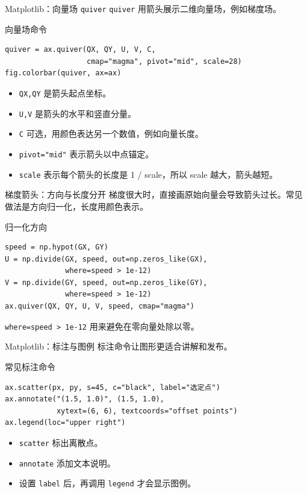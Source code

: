\documentclass[aspectratio=169,11pt]{ctexbeamer}
\begin{document}
\begin{frame}[fragile]{Matplotlib：向量场 \texttt{quiver}}
  \texttt{quiver} 用箭头展示二维向量场，例如梯度场。

  \begin{block}{向量场命令}
\begin{Verbatim}[fontsize=\small]
quiver = ax.quiver(QX, QY, U, V, C,
                   cmap="magma", pivot="mid", scale=28)
fig.colorbar(quiver, ax=ax)
\end{Verbatim}
  \end{block}

  \begin{itemize}
    \item \texttt{QX,QY} 是箭头起点坐标。
    \item \texttt{U,V} 是箭头的水平和竖直分量。
    \item \texttt{C} 可选，用颜色表达另一个数值，例如向量长度。
    \item \texttt{pivot="mid"} 表示箭头以中点锚定。
    \item \texttt{scale} 表示每个箭头的长度是 1 / scale，所以 scale 越大，箭头越短。
  \end{itemize}
\end{frame}

\begin{frame}[fragile]{梯度箭头：方向与长度分开}
  梯度很大时，直接画原始向量会导致箭头过长。常见做法是方向归一化，长度用颜色表示。

  \begin{block}{归一化方向}
\begin{Verbatim}[fontsize=\small]
speed = np.hypot(GX, GY)
U = np.divide(GX, speed, out=np.zeros_like(GX),
              where=speed > 1e-12)
V = np.divide(GY, speed, out=np.zeros_like(GY),
              where=speed > 1e-12)
ax.quiver(QX, QY, U, V, speed, cmap="magma")
\end{Verbatim}
  \end{block}

  \texttt{where=speed > 1e-12} 用来避免在零向量处除以零。
\end{frame}

\begin{frame}[fragile]{Matplotlib：标注与图例}
  标注命令让图形更适合讲解和发布。

  \begin{block}{常见标注命令}
\begin{Verbatim}[fontsize=\small]
ax.scatter(px, py, s=45, c="black", label="选定点")
ax.annotate("(1.5, 1.0)", (1.5, 1.0),
            xytext=(6, 6), textcoords="offset points")
ax.legend(loc="upper right")
\end{Verbatim}
  \end{block}

  \begin{itemize}
    \item \texttt{scatter} 标出离散点。
    \item \texttt{annotate} 添加文本说明。
    \item 设置 \texttt{label} 后，再调用 \texttt{legend} 才会显示图例。
  \end{itemize}
\end{frame}
\end{document}
